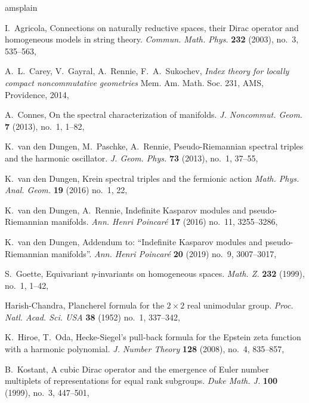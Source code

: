 \documentclass{amsart}
\theoremstyle{definition}
\theoremstyle{remark}
\numberwithin{equation}{section}
\begin{document}
\begin{thebibliography}{amsplain}

I.~Agricola, Connections on naturally reductive spaces, their Dirac operator and homogeneous models in string theory.
\emph{Commun. Math. Phys.} \textbf{232} (2003), no.~3, 535--563,

A.~L.~Carey, V.~Gayral, A.~Rennie, F.~A.~Sukochev, \emph{Index theory for locally compact noncommutative geometries}
Mem. Am. Math. Soc. 231, AMS, Providence, 2014,

A.~Connes, On the spectral characterization of manifolds.
\emph{J. Noncommut. Geom.} \textbf{7} (2013), no.~1, 1--82,

K.~van den Dungen, M.~Paschke, A.~Rennie, Pseudo-Riemannian spectral triples and the harmonic oscillator.
\emph{J. Geom. Phys.} \textbf{73} (2013), no.~1, 37--55,

K.~van den Dungen, Krein spectral triples and the fermionic action
\emph{Math. Phys. Anal. Geom.} \textbf{19} (2016) no.~1, 22,

K.~van den Dungen, A.~Rennie, Indefinite Kasparov modules and pseudo-Riemannian manifolds.
\emph{Ann. Henri Poincar\'e} \textbf{17} (2016) no.~11, 3255--3286,

K.~van den Dungen, Addendum to: ``Indefinite Kasparov modules and pseudo-Riemannian manifolds''.
\emph{Ann. Henri Poincar{\'e}} \textbf{20} (2019) no.~9, 3007--3017, 

S.~Goette, Equivariant \(\eta\)-invariants on homogeneous spaces.
\emph{Math. Z.} \textbf{232} (1999), no.~1, 1--42,

Harish-Chandra, Plancherel formula for the \(2\times 2\) real unimodular group.
\emph{Proc. Natl. Acad. Sci. USA} \textbf{38} (1952) no.~1, 337--342,

K.~Hiroe, T.~Oda, Hecke-Siegel's pull-back formula for the Epstein zeta function with a harmonic polynomial.
\emph{J. Number Theory} \textbf{128} (2008), no.~4, 835--857,

B.~Kostant, A cubic Dirac operator and the emergence of Euler number multiplets of representations for equal rank subgroups.
\emph{Duke Math. J.} \textbf{100} (1999), no.~3, 447--501,


\end{thebibliography}
\end{document}
